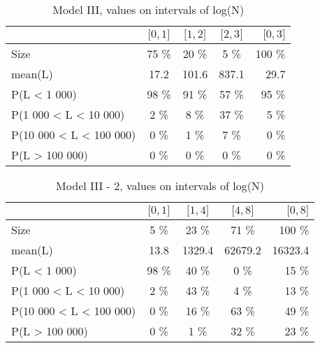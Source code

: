\documentclass[numbered]{CSL}
\begin{document}
\setlength{\tabcolsep}{0.5em}
\begin{table}
\centering
\caption{Model III, values on intervals of log(N) \label{table:NModelIII}}
\begin{tabular}{l|ccc|r}
\toprule
{} & \small{$\lbrack 0, 1 \rbrack$} & \small{$\lbrack 1, 2 \rbrack$} & \small{$\lbrack 2, 3 \rbrack$} & \small{$\lbrack 0, 3 \rbrack$} \\
\midrule
Size                    &               75 \% &               20 \% &                5 \% &              100 \% \\
mean(L)                 &               17.2 &              101.6 &              837.1 &               29.7 \\
P(L < 1 000)            &               98 \% &               91 \% &               57 \% &               95 \% \\
P(1 000 < L < 10 000)   &                2 \% &                8 \% &               37 \% &                5 \% \\
P(10 000 < L < 100 000) &                0 \% &                1 \% &                7 \% &                0 \% \\
P(L > 100 000)          &                0 \% &                0 \% &                0 \% &                0 \% \\
\bottomrule
\end{tabular}
\end{table}

\setlength{\tabcolsep}{0.5em}
\begin{table}
\centering
\caption{Model III - 2, values on intervals of log(N) \label{table:NModelIII-2}}
\begin{tabular}{l|ccc|r}
\toprule
{} & \small{$\lbrack 0, 1 \rbrack$} & \small{$\lbrack 1, 4 \rbrack$} & \small{$\lbrack 4, 8 \rbrack$} & \small{$\lbrack 0, 8 \rbrack$} \\
\midrule
Size                    &                5 \% &               23 \% &               71 \% &              100 \% \\
mean(L)                 &               13.8 &             1329.4 &            62679.2 &            16323.4 \\
P(L < 1 000)            &               98 \% &               40 \% &                0 \% &               15 \% \\
P(1 000 < L < 10 000)   &                2 \% &               43 \% &                4 \% &               13 \% \\
P(10 000 < L < 100 000) &                0 \% &               16 \% &               63 \% &               49 \% \\
P(L > 100 000)          &                0 \% &                1 \% &               32 \% &               23 \% \\
\bottomrule
\end{tabular}
\end{table}
\end{document}
